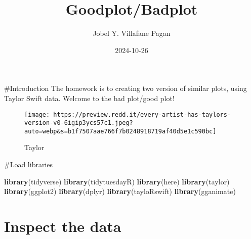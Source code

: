 \documentclass[
]{article}
\title{Goodplot/Badplot}
\author{Jobel Y. Villafane Pagan}
\date{2024-10-26}
\newenvironment{Shaded}{\begin{snugshade}}{\end{snugshade}}
\newcommand{\AttributeTok}[1]{\textcolor[rgb]{0.13,0.29,0.53}{#1}}
\newcommand{\DecValTok}[1]{\textcolor[rgb]{0.00,0.00,0.81}{#1}}
\newcommand{\FunctionTok}[1]{\textcolor[rgb]{0.13,0.29,0.53}{\textbf{#1}}}
\newcommand{\NormalTok}[1]{#1}
\newcommand{\OtherTok}[1]{\textcolor[rgb]{0.56,0.35,0.01}{#1}}
\newcommand{\SpecialCharTok}[1]{\textcolor[rgb]{0.81,0.36,0.00}{\textbf{#1}}}
\begin{document}
\maketitle

\#Introduction The homework is to creating two version of similar plots,
using Taylor Swift data. Welcome to the bad plot/good plot!

\begin{figure}
\centering
\texttt{[image: https://preview.redd.it/every-artist-has-taylors-version-v0-6igip3ycs57c1.jpeg?auto=webp\&s=b1f7507aae766f7b0248918719af40d5e1c590bc]}
\caption{Taylor}
\end{figure}

\#Load libraries

\begin{Shaded}
\begin{Highlighting}[]
\FunctionTok{library}\NormalTok{(tidyverse)}
\FunctionTok{library}\NormalTok{(tidytuesdayR)}
\FunctionTok{library}\NormalTok{(here)}
\FunctionTok{library}\NormalTok{(taylor)}
\FunctionTok{library}\NormalTok{(ggplot2)}
\FunctionTok{library}\NormalTok{(dplyr)}
\FunctionTok{library}\NormalTok{(tayloRswift)}
\FunctionTok{library}\NormalTok{(gganimate)}
\end{Highlighting}
\end{Shaded}

\section{Inspect the data}\label{inspect-the-data}

\begin{Shaded}
\end{Shaded}
\end{document}
